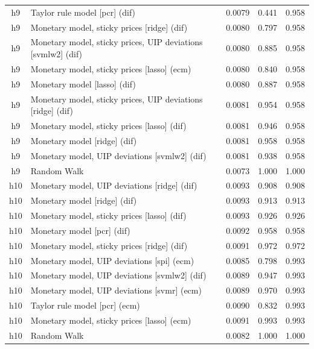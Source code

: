 \begin{ThreePartTable}
\begin{longtable}[t]{cp{5.5cm}ccc}
h9 & \raggedright Taylor rule model [pcr] (dif) & 0.0079 & 0.441 & 0.958\\
h9 & \raggedright Monetary model, sticky prices [ridge] (dif) & 0.0080 & 0.797 & 0.958\\
h9 & \raggedright Monetary model, sticky prices, UIP deviations [svmlw2] (dif) & 0.0080 & 0.885 & 0.958\\
h9 & \raggedright Monetary model, sticky prices [lasso] (ecm) & 0.0080 & 0.840 & 0.958\\
h9 & \raggedright Monetary model [lasso] (dif) & 0.0080 & 0.887 & 0.958\\
h9 & \raggedright Monetary model, sticky prices, UIP deviations [ridge] (dif) & 0.0081 & 0.954 & 0.958\\
h9 & \raggedright Monetary model, sticky prices [lasso] (dif) & 0.0081 & 0.946 & 0.958\\
h9 & \raggedright Monetary model [ridge] (dif) & 0.0081 & 0.958 & 0.958\\
h9 & \raggedright Monetary model, UIP deviations [svmlw2] (dif) & 0.0081 & 0.938 & 0.958\\
h9 & \raggedright Random Walk & 0.0073 & 1.000 & 1.000\\
\addlinespace
h10 & \raggedright Monetary model, UIP deviations [ridge] (dif) & 0.0093 & 0.908 & 0.908\\
h10 & \raggedright Monetary model [ridge] (dif) & 0.0093 & 0.913 & 0.913\\
h10 & \raggedright Monetary model, sticky prices [lasso] (dif) & 0.0093 & 0.926 & 0.926\\
h10 & \raggedright Monetary model [pcr] (dif) & 0.0092 & 0.958 & 0.958\\
h10 & \raggedright Monetary model, sticky prices [ridge] (dif) & 0.0091 & 0.972 & 0.972\\
h10 & \raggedright Monetary model, UIP deviations [spi] (ecm) & 0.0085 & 0.798 & 0.993\\
h10 & \raggedright Monetary model, UIP deviations [svmlw2] (dif) & 0.0089 & 0.947 & 0.993\\
h10 & \raggedright Monetary model, UIP deviations [svmr] (ecm) & 0.0089 & 0.970 & 0.993\\
h10 & \raggedright Taylor rule model [pcr] (ecm) & 0.0090 & 0.832 & 0.993\\
h10 & \raggedright Monetary model, sticky prices [lasso] (ecm) & 0.0091 & 0.993 & 0.993\\
h10 & \raggedright Random Walk & 0.0082 & 1.000 & 1.000\\

\end{longtable}
\end{ThreePartTable}
